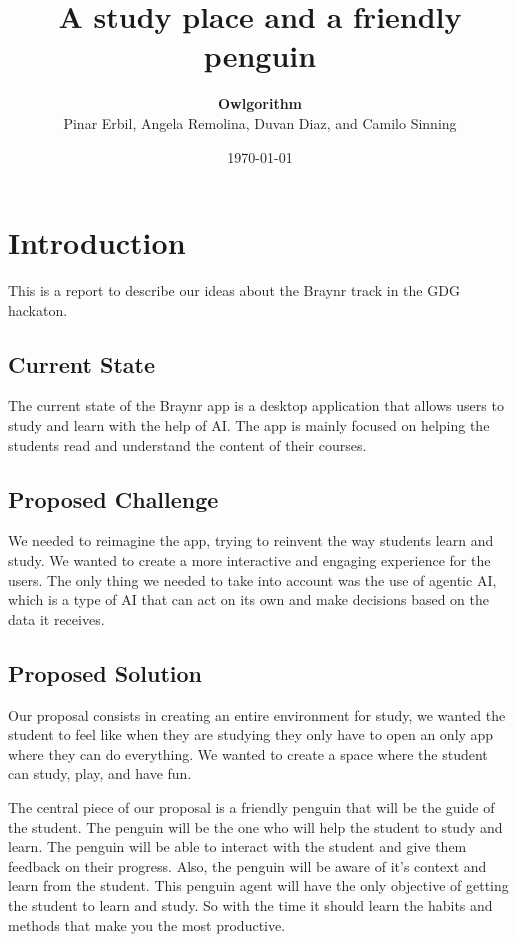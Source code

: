 \documentclass{report}
\title{A study place and a friendly penguin}
\author{\textbf{Owlgorithm} \\ Pinar Erbil, Angela Remolina, Duvan Diaz, and Camilo Sinning}
\date{\today}
\begin{document}
\maketitle

\newpage

\chapter{Introduction}

This is a report to describe our ideas about the Braynr track in the GDG hackaton.

\section{Current State}

The current state of the Braynr app is a desktop application that allows users to study and learn with the help of AI. The app is mainly focused on helping the students read and understand the content of their courses. 

\section{Proposed Challenge}
We needed to reimagine the app, trying to reinvent the way students learn and study. We wanted to create a more interactive and engaging experience for the users. The only thing we needed to take into account was the use of agentic AI, which is a type of AI that can act on its own and make decisions based on the data it receives.

\section{Proposed Solution}

Our proposal consists in creating an entire environment for study, we wanted the student to feel like when they are studying they only have to open an only app where they can do everything. We wanted to create a space where the student can study, play, and have fun. 

The central piece of our proposal is a friendly penguin that will be the guide of the student. The penguin will be the one who will help the student to study and learn. The penguin will be able to interact with the student and give them feedback on their progress. Also, the penguin will be aware of it's context and learn from the student. This penguin agent will have the only objective of getting the student to learn and study. So with the time it should learn the habits and methods that make you the most productive.
\end{document}
